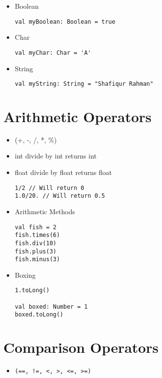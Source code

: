 \documentclass[11pt]{article}
\begin{document}
\begin{itemize}
\item Boolean
\begin{verbatim}
val myBoolean: Boolean = true
\end{verbatim}

\item Char
\begin{verbatim}
val myChar: Char = 'A'
\end{verbatim}

\item String
\begin{verbatim}
val myString: String = "Shafiqur Rahman"
\end{verbatim}
\end{itemize}
\section*{Arithmetic Operators}
\label{sec:org69c960c}
\begin{itemize}
\item (+, -, /, *, \%)
\item int divide by int returns int
\item float divide by float returns float
\begin{verbatim}
1/2 // Will return 0
1.0/20. // Will return 0.5
\end{verbatim}
\item Arithmetic Methods
\begin{verbatim}
val fish = 2
fish.times(6)
fish.div(10)
fish.plus(3)
fish.minus(3)
\end{verbatim}
\item Boxing
\begin{verbatim}
1.toLong()

val boxed: Number = 1
boxed.toLong()
\end{verbatim}
\end{itemize}
\section*{Comparison Operators}
\label{sec:orgf4de9a1}
\begin{itemize}
\item \texttt{(==, !=, <, >, <=, >=)}
\end{itemize}
\end{document}
